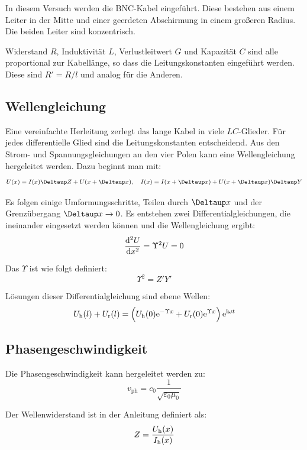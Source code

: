 In diesem Versuch werden die BNC-Kabel eingeführt. Diese bestehen aus einem
Leiter in der Mitte und einer geerdeten Abschirmung in einem großeren Radius.
Die beiden Leiter sind konzentrisch.

Widerstand $R$, Induktivität $L$, Verlustleitwert $G$ und Kapazität $C$ sind
alle proportional zur Kabellänge, so dass die Leitungskonstanten eingeführt
werden. Diese sind $R' = R/l$ und analog für die Anderen.

\subsection{Wellengleichung}

Eine vereinfachte Herleitung zerlegt das lange Kabel in viele $LC$-Glieder. Für
jedes differentielle Glied sind die Leitungskonstanten entscheidend. Aus den
Strom- und Spannungsgleichungen an den vier Polen kann eine Wellengleichung
hergeleitet werden. Dazu beginnt man mit:
\[
	U(x) = I(x) \Deltaup Z + U(x + \Deltaup x)
	\eqnsep
	I(x) = I(x + \Deltaup x) + U(x + \Deltaup x) \Deltaup Y
\]

Es folgen einige Umformungsschritte, Teilen durch $\Deltaup x$ und der
Grenzübergang $\Deltaup x \to 0$. Es entstehen zwei Differentialgleichungen,
die ineinander eingesetzt werden können und die Wellengleichung ergibt:
\[
	\dod[2] Ux = \Upsilon^2 U = 0
\]

Das $\Upsilon$ ist wie folgt definiert:
\begin{equation}
	\label{eq:1.6}
	\Upsilon^2 = Z' Y'
\end{equation}

Lösungen dieser Differentialgleichung sind ebene Wellen:
\begin{equation}
	\label{eq:1.7}
	\Uh(l) + \Ur(l)
	= \del{\Uh(0) \eup^{-\Upsilon x} + \Ur(0) \eup^{\Upsilon x}} \eup^{\iup \omega t}
\end{equation}

\subsection{Phasengeschwindigkeit}

Die Phasengeschwindigkeit kann hergeleitet werden zu:
\begin{equation}
	\label{eq:1.13}
	v_\text{ph} = c_0 \frac{1}{\sqrt{\varepsilon_0 \mu_0}}
\end{equation}

Der Wellenwiderstand ist in der Anleitung definiert als:
\begin{equation}
	\label{eq:1.14}
	Z = \frac{U_\text h (x)}{I_\text h (x)}
\end{equation}

